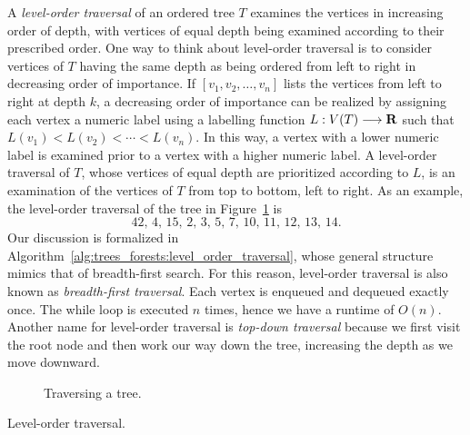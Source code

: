 A \emph{level-order traversal} of an
ordered tree $T$ examines the vertices in increasing order of depth,
with vertices of equal depth being examined according to their
prescribed order. One way to think about
level-order traversal is to consider
vertices of $T$ having the same depth as being ordered from left to
right in decreasing order of importance. If $[v_1, v_2, \dots, v_n]$
lists the vertices from left to right at depth $k$, a decreasing order
of importance can be realized by assigning each vertex a numeric label
using a labelling function $L: V(T) \longrightarrow \mathbf{R}$ such that
$L(v_1) < L(v_2) < \cdots < L(v_n)$. In this way, a vertex with a
lower numeric label is examined prior to a vertex with a higher
numeric label. A level-order traversal of
$T$, whose vertices of equal depth are prioritized according to $L$,
is an examination of the vertices of $T$ from top to bottom, left to
right. As an example, the level-order
traversal of the tree in Figure~\ref{fig:trees_forests:tree_traversal}
is
\[
42,\, 4,\, 15,\, 2,\, 3,\, 5,\, 7,\, 10,\, 11,\, 12,\, 13,\, 14.
\]
Our discussion is formalized in
Algorithm~\ref{alg:trees_forests:level_order_traversal}, whose general
structure mimics that of breadth-first
search. For this reason, level-order traversal is also known as
\emph{breadth-first traversal}. Each vertex is
enqueued and dequeued
exactly once. The while loop is executed $n$ times, hence we have a
runtime of $O(n)$. Another name for level-order traversal is
\emph{top-down traversal} because we first visit the root node and
then work our way down the tree, increasing the depth as we move
downward.

\begin{figure}[!htbp]
\centering
{}

\caption{Traversing a tree.}
\label{fig:trees_forests:tree_traversal}
\end{figure}

\begin{algorithm}[!htbp]

\caption{Level-order traversal.}
\label{alg:trees_forests:level_order_traversal}
\end{algorithm}

